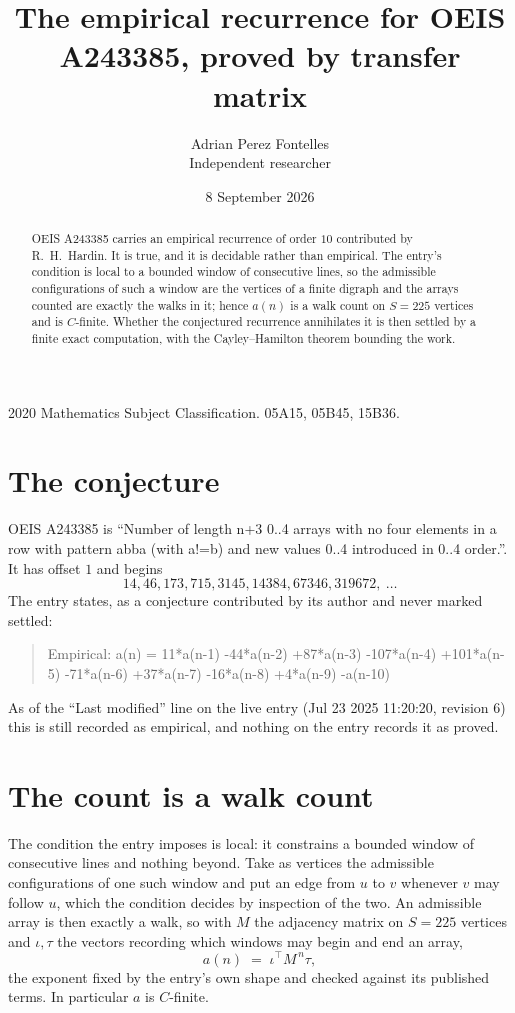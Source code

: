 \documentclass[11pt,a4paper]{article}
\title{The empirical recurrence for OEIS A243385, proved by transfer matrix}
\author{Adrian Perez Fontelles\\ \small Independent researcher}
\date{8 September 2026}
\theoremstyle{plain}
\theoremstyle{definition}
\begin{document}
\maketitle

\begin{abstract}
OEIS A243385 carries an empirical recurrence of order $10$ contributed by R.~H.~Hardin. It is
true, and it is decidable rather than empirical. The entry's condition is local to a bounded window of consecutive lines, so
the admissible configurations of such a window are the vertices of a finite digraph and the
arrays counted are exactly the walks in it; hence $a(n)$ is a walk count on $S=225$ vertices
and is $C$-finite. Whether the conjectured recurrence annihilates it is then settled by a
finite exact computation, with the Cayley--Hamilton theorem bounding the work.
\end{abstract}

\noindent\small 2020 Mathematics Subject Classification. 05A15, 05B45, 15B36.\normalsize

\section{The conjecture}

OEIS A243385 is ``Number of length n+3 0..4 arrays with no four elements in a row with pattern abba (with a!=b) and new values 0..4 introduced in 0..4 order.''. It has offset $1$ and begins
\[
14, 46, 173, 715, 3145, 14384, 67346, 319672,\ \dots
\]
The entry states, as a conjecture contributed by its author and never marked settled:
\begin{quote}
Empirical: a(n) = 11*a(n-1) -44*a(n-2) +87*a(n-3) -107*a(n-4) +101*a(n-5) -71*a(n-6) +37*a(n-7) -16*a(n-8) +4*a(n-9) -a(n-10)
\end{quote}
As of the ``Last modified'' line on the live entry (Jul 23 2025 11:20:20, revision 6) this is still
recorded as empirical, and nothing on the entry records it as proved.

\section{The count is a walk count}

The condition the entry imposes is local: it constrains a bounded window of consecutive lines and nothing beyond. Take as
vertices the admissible configurations of one such window and put an edge from $u$ to $v$
whenever $v$ may follow $u$, which the condition decides by inspection of the two. An
admissible array is then exactly a walk, so with $M$ the adjacency matrix on $S=225$ vertices
and $\iota,\tau$ the vectors recording which windows may begin and end an array,
\[
a(n)\;=\;\iota^{\!\top}M^{\,n}\tau ,
\]
the exponent fixed by the entry's own shape and checked against its published terms. In
particular $a$ is $C$-finite.
\end{document}
